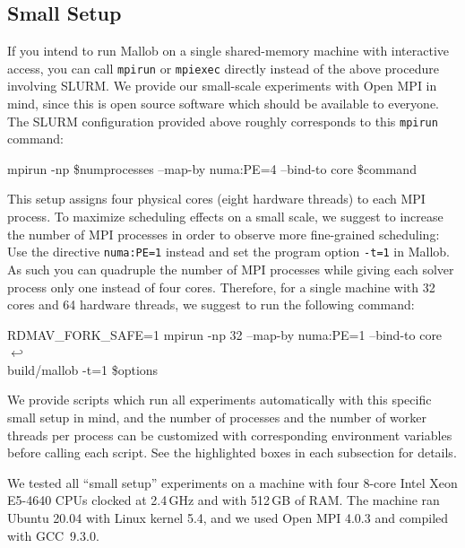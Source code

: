 \documentclass[runningheads]{article}
\newcommand{\CR}{{\tiny$\hookleftarrow$}}
\numberwithin{dummy}{subsection}
\begin{document}
\subsection{Small Setup}
\label{sec:small-setup}

If you intend to run Mallob on a single shared-memory machine with interactive access, you can call \texttt{mpirun} or \texttt{mpiexec} directly instead of the above procedure involving SLURM.
We provide our small-scale experiments with Open MPI in mind, since this is open source software which should be available to everyone.
The SLURM configuration provided above roughly corresponds to this \texttt{mpirun} command:

\begin{ttfenv}
mpirun -np \$numprocesses --map-by numa:PE=4 --bind-to core \$command
\end{ttfenv}

This setup assigns four physical cores (eight hardware threads) to each MPI process.
To maximize scheduling effects on a small scale, we suggest to increase the number of MPI processes in order to observe more fine-grained scheduling: 
Use the directive \texttt{numa:PE=1} instead and set the program option \texttt{-t=1} in Mallob.
As such you can quadruple the number of MPI processes while giving each solver process only one instead of four cores.
Therefore, for a single machine with 32 cores and 64 hardware threads, we suggest to run the following command:

\begin{ttfenv}
RDMAV\_FORK\_SAFE=1 mpirun -np 32 --map-by numa:PE=1 --bind-to core \CR\\
\hspace*{0.3cm}build/mallob -t=1 \$options
\end{ttfenv}

We provide scripts which run all experiments automatically with this specific small setup in mind, and the number of processes and the number of worker threads per process can be customized with corresponding environment variables before calling each script. 
See the highlighted boxes in each subsection for details.

We tested all ``small setup'' experiments on a machine with four 8-core Intel Xeon E5-4640 CPUs clocked at 2.4\,GHz and with 512\,GB of RAM.
The machine ran Ubuntu 20.04 with Linux kernel 5.4, and we used Open MPI 4.0.3 and compiled with GCC~9.3.0.
\end{document}
